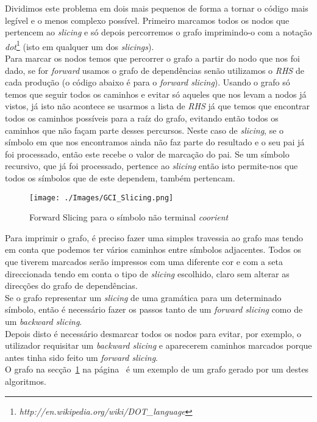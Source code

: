 \documentclass[a4paper,11pt]{article}
\begin{document}
Dividimos este problema em dois mais pequenos de forma a tornar o código mais legível e o menos complexo possível. Primeiro marcamos todos os nodos que pertencem ao {\em slicing} e só depois percorremos o grafo imprimindo-o com a notação {\em dot}\footnote{{\em http://en.wikipedia.org/wiki/DOT\_language}} (isto em qualquer um dos {\em slicings}).\\
\newline
Para marcar os nodos temos que percorrer o grafo a partir do nodo que nos foi dado, se for {\em forward} usamos o grafo de dependências senão utilizamos o {\em RHS} de cada produção (o código abaixo é para o {\em forward slicing}). Usando o grafo só temos que seguir todos os caminhos e evitar só aqueles que nos levam a nodos já vistos, já isto não acontece se usarmos a lista de {\em RHS} já que temos que encontrar todos os caminhos possíveis para a raíz do grafo, evitando então todos os caminhos que não façam parte desses percursos. Neste caso de {\em slicing}, se o símbolo em que nos encontramos ainda não faz parte do resultado e o seu pai já foi processado, então este recebe o valor de marcação do pai. Se um símbolo recursivo, que já foi processado, pertence ao {\em slicing} então isto permite-nos que todos os símbolos que de este dependem, também pertencam.

\begin{figure}[!ht] \label{fig:1}
\begin{center}
\texttt{[image: ./Images/GCI\_Slicing.png]}
\end{center}
\caption{Forward Slicing para o símbolo não terminal {\em coorient}}
\end{figure}

Para imprimir o grafo, é preciso fazer uma simples travessia ao grafo mas tendo em conta que podemos ter vários caminhos entre símbolos adjacentes. Todos os que tiverem marcados serão impressos com uma diferente cor e com a seta direccionada tendo em conta o tipo de {\em slicing} escolhido, claro sem alterar as direcções do grafo de dependências.\\
\newline
Se o grafo representar um {\em slicing} de uma gramática para um determinado símbolo, então é necessário fazer os passos tanto de um {\em forward slicing} como de um {\em backward slicing}.\\
\newline
Depois disto é necessário desmarcar todos os nodos para evitar, por exemplo, o utilizador requisitar um {\em backward slicing} e aparecerem caminhos marcados porque antes tinha sido feito um {\em forward slicing}.\\
\newline
O grafo na secção~\ref{fig:1} na página~\pageref{fig:1} é um exemplo de um grafo gerado por um destes algoritmos.
\end{document}
